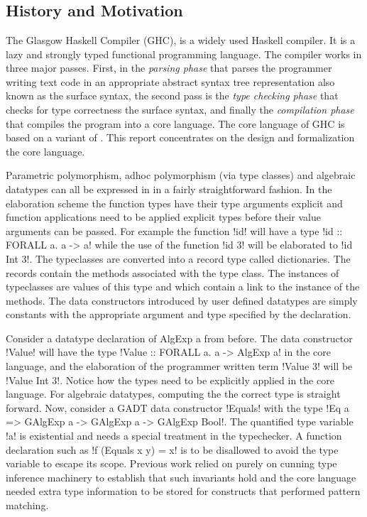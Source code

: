 \documentclass[manuscript,screen,nonacm]{acmart}
\begin{document}
\section{\SFC}\label{sec:sfc}
\subsection{History and Motivation}
The Glasgow Haskell Compiler (GHC)\cite{ghc_2020}, is a widely used Haskell\cite{haskell_2010} compiler. It is a lazy and strongly typed functional programming language. The compiler works in three major passes. First, in the \emph{parsing phase} that parses the programmer writing text code in an appropriate abstract syntax tree representation also known as the surface syntax, the second pass is the \emph{type checking phase} that checks for type correctness the surface syntax, and finally the \emph{compilation phase} that compiles the program into a core language. The core language of GHC is based on a variant of \SF. This report concentrates on the design and formalization the core language.

Parametric polymorphism, adhoc polymorphism (via type classes)\cite{hall_type_1994} and algebraic datatypes can all be expressed in \SF in a fairly straightforward fashion\cite{TODO}. In the elaboration scheme the function types have their type arguments explicit and function applications need to be applied explicit types before their value arguments can be passed. For example the function !id! will have a type !id :: FORALL a. a -> a! while the use of the function !id 3! will be elaborated to !id Int 3!. The typeclasses are converted into a record type called dictionaries. The records contain the methods associated with the type class. The instances of typeclasses are values of this type and which contain a link to the instance of the methods. The data constructors introduced by user defined datatypes are simply constants with the appropriate argument and type specified by the declaration.

Consider a datatype declaration of AlgExp a from before. The data constructor !Value! will have the type !Value :: FORALL a. a -> AlgExp a! in the core language, and the elaboration of the programmer written term !Value 3! will be !Value Int 3!. Notice how the types need to be explicitly applied in the core language. For algebraic datatypes, computing the the correct type is straight forward. Now, consider a GADT data constructor
!Equals! with the type !Eq a => GAlgExp a -> GAlgExp a -> GAlgExp Bool!. The quantified type variable !a! is existential and needs a special treatment in the typechecker. A function declaration such as !f (Equals x y) = x! is to be disallowed to avoid the type variable to escape its scope. Previous work relied on purely on cunning type inference machinery to establish that such invariants hold and the core language needed extra type information to be stored for constructs that performed pattern matching.
\end{document}
